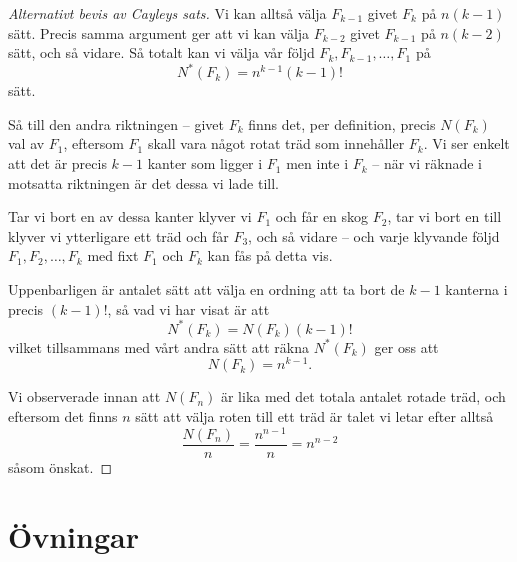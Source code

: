 \documentclass[nobib]{tufte-handout}
\begin{document}
\begin{proof}[Alternativt bevis av Cayleys sats]
    Vi kan alltså välja $F_{k-1}$ givet $F_k$ på $n(k-1)$ sätt. Precis samma argument ger att vi kan välja $F_{k-2}$ givet $F_{k-1}$ på $n(k-2)$ sätt, och så vidare. Så totalt kan vi välja vår följd $F_k, F_{k-1}, \ldots, F_1$ på
    $$N^*(F_k) = n^{k-1}(k-1)!$$
    sätt.

    Så till den andra riktningen -- givet $F_k$ finns det, per definition, precis $N(F_k)$ val av $F_1$, eftersom $F_1$ skall vara något rotat träd som innehåller $F_k$. Vi ser enkelt att det är precis $k-1$ kanter som ligger i $F_1$ men inte i $F_k$ -- när vi räknade i motsatta riktningen är det dessa vi lade till.

    Tar vi bort en av dessa kanter klyver vi $F_1$ och får en skog $F_2$, tar vi bort en till klyver vi ytterligare ett träd och får $F_3$, och så vidare -- och varje klyvande följd $F_1, F_2, \ldots, F_k$ med fixt $F_1$ och $F_k$ kan fås på detta vis.

    Uppenbarligen är antalet sätt att välja en ordning att ta bort de $k-1$ kanterna i precis $(k-1)!$, så vad vi har visat är att
    $$N^*(F_k) = N(F_k)(k-1)!$$
    vilket tillsammans med vårt andra sätt att räkna $N^*(F_k)$ ger oss att
    $$N(F_k) = n^{k-1}.$$

    Vi observerade innan att $N(F_n)$ är lika med det totala antalet rotade träd, och eftersom det finns $n$ sätt att välja roten till ett träd är talet vi letar efter alltså
    $$\frac{N(F_n)}{n} = \frac{n^{n-1}}{n} = n^{n-2}$$
    såsom önskat.
\end{proof}

\section{Övningar}
\end{document}
